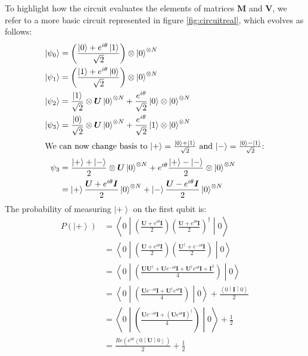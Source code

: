 \documentclass{aux/ttuthes2007}
\newcommand{\ket}[1]{\ensuremath{\left|#1\right\rangle}}
\newcommand{\sandwich}[3]{\left< #1 \middle\vert #2 \middle\vert #3 \right>}
\newcommand{\paren}[1]{\left( #1 \right)}
\newcommand{\elec}{N}
\begin{document}
To highlight how the circuit evaluates the elements of matrices $\bm M$ and $\bm V$, we refer to a more basic circuit represented in figure \ref{fig:circuitreal}, which evolves as follows:
\begin{equation*}
	\begin{split}
		\ket {\psi_0}
		&= \paren{\frac{\ket 0 + e^{i\theta}\ket 1}{\sqrt 2}}\otimes \ket 0^{\otimes\elec} \\
		\ket {\psi_1}
		&= \paren{\frac{\ket 1 + e^{i\theta}\ket 0}{\sqrt 2}}\otimes \ket 0^{\otimes\elec} \\
		\ket {\psi_2}
		&= \frac{\ket 1}{\sqrt 2} \otimes \bm U \ket 0^{\otimes\elec} + \frac{e^{i\theta}}{\sqrt 2}\ket 0 \otimes \ket 0^{\otimes\elec} \\
		\ket {\psi_3}
		&= \frac{\ket 0}{\sqrt 2} \otimes \bm U \ket 0^{\otimes\elec} + \frac{e^{i\theta}}{\sqrt 2}\ket 1 \otimes \ket 0^{\otimes\elec} \\
		\intertext{\text{We can now change basis to 
		$\ket + = \frac{\ket 0 + \ket 1}{\sqrt 2}$
		and
		$\ket - = \frac{\ket 0 - \ket 1}{\sqrt 2}$:}}
		\psi_3
		&= \frac{\ket + + \ket -}{2} \otimes \bm U \ket 0^{\otimes\elec} + e^{i\theta}\frac{\ket + - \ket -}{2} \otimes \ket 0^{\otimes\elec} \\
		&= \ket + \frac{\bm U + e^{i\theta}\bm I}{2}\ket 0^{\otimes\elec} 
		+ \ket - \frac{\bm U - e^{i\theta}\bm I}{2}\ket 0^{\otimes\elec} 
	\end{split}
\end{equation*}
%
The probability of measuring $\ket +$ on the first qubit is:
%
\begin{equation*}
	\begin{split}
		P(\ket +)
		&= \sandwich 0 {
			\paren{\frac{\bm U + e^{i\theta}\bm I}{2}}
			\paren{\frac{\bm U + e^{i\theta}\bm I}{2}}^\dagger
		} 0 \\
		&= \sandwich 0 {
			\paren{\frac{\bm U + e^{i\theta}\bm I}{2}}
			\paren{\frac{\bm U^\dagger + e^{-i\theta}\bm I}{2}}
		} 0 \\
		&= \sandwich 0 {
			\paren{\frac{\bm U\bm U^\dagger + \bm Ue^{-i\theta}\bm I + \bm U^\dagger e^{i\theta}\bm I + \bm I^2}{4}}
		} 0 \\
		&= \sandwich 0 {
			\paren{\frac{\bm Ue^{-i\theta}\bm I + \bm U^\dagger e^{i\theta}\bm I}{4}}
		} 0 
		+ \frac{\sandwich 0 {\bm I} 0}{2} \\
		&= \sandwich 0 {
			\paren{\frac{\bm Ue^{-i\theta}\bm I + \paren{\bm Ue^{i\theta}\bm I}^\dagger}{4}}
		} 0 
		+ \frac{1}{2} \\
		&= \frac{Re \paren{e^{i\theta}\sandwich 0 { \bm U } 0}}{2}
		+ \frac{1}{2} \\
	\end{split}
\end{equation*}
\end{document}
